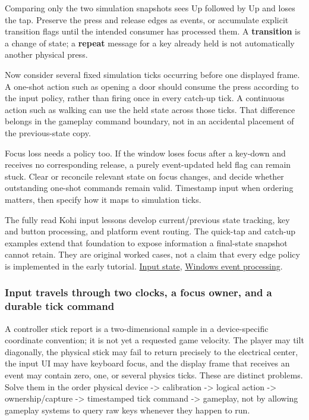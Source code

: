 Comparing only the two simulation snapshots sees Up followed by Up and loses the tap. Preserve the press and release edges as events, or accumulate explicit transition flags until the intended consumer has processed them. A \textbf{transition} is a change of state; a \textbf{repeat} message for a key already held is not automatically another physical press.

Now consider several fixed simulation ticks occurring before one displayed frame. A one-shot action such as opening a door should consume the press according to the input policy, rather than firing once in every catch-up tick. A continuous action such as walking can use the held state across those ticks. That difference belongs in the gameplay command boundary, not in an accidental placement of the previous-state copy.

Focus loss needs a policy too. If the window loses focus after a key-down and receives no corresponding release, a purely event-updated held flag can remain stuck. Clear or reconcile relevant state on focus changes, and decide whether outstanding one-shot commands remain valid. Timestamp input when ordering matters, then specify how it maps to simulation ticks.

The fully read Kohi input lessons develop current/previous state tracking, key and button processing, and platform event routing. The quick-tap and catch-up examples extend that foundation to expose information a final-state snapshot cannot retain. They are original worked cases, not a claim that every edge policy is implemented in the early tutorial. \href{https://www.youtube.com/watch?v=ZZhfCYNbVp8}{Input state}, \href{https://www.youtube.com/watch?v=6zjpgUX1TRY}{Windows event processing}.

\subsubsection{Input travels through two clocks, a focus owner, and a durable tick command}\label{05-engine-i-ch014-input-travels-through-two-clocks-a-focus-owner-and-a-durable-tick-command}

\hypertarget{05-engine-i-ch014-input-travels-through-two-clocks-a-focus-owner-and-a-durable-tick-command}{}

A controller stick report is a two-dimensional sample  in a device-specific coordinate convention; it is not yet a requested game velocity. The player may tilt diagonally, the physical stick may fail to return precisely to the electrical center, the input UI may have keyboard focus, and the display frame that receives an event may contain zero, one, or several physics ticks. These are distinct problems. Solve them in the order physical device -\textgreater{} calibration -\textgreater{} logical action -\textgreater{} ownership/capture -\textgreater{} timestamped tick command -\textgreater{} gameplay, not by allowing gameplay systems to query raw keys whenever they happen to run.

